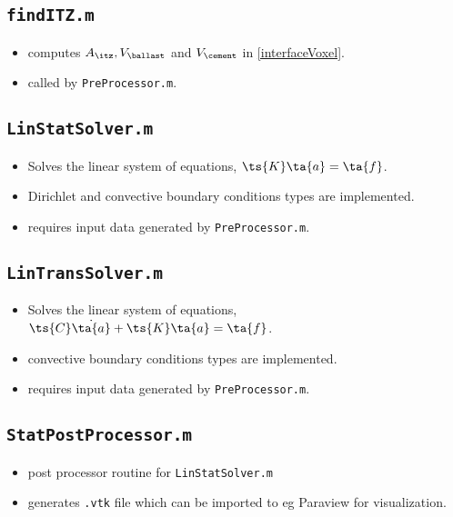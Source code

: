 \documentclass[12pt]{article}
\begin{document}
\subsection{\texttt{findITZ.m} 
}
\begin{itemize}
\item computes $A_\itz, V_\ballast$ and $V_\cement$ in \cref{interfaceVoxel}.
\item called by \verb|PreProcessor.m|.
\end{itemize}

\subsection{\texttt{LinStatSolver.m} 
}
\begin{itemize}
\item Solves the linear system of equations, $\ts{K}\ta{a} = \ta{f}$.
\item Dirichlet and convective boundary conditions types are implemented.
\item requires input data generated by \verb|PreProcessor.m|.
\end{itemize}

\subsection{\texttt{LinTransSolver.m} 
}
\begin{itemize}
\item Solves the linear system of equations, $\ts{C}\dot{\ta{a}} + \ts{K}\ta{a} = \ta{f}$.
\item convective boundary conditions types are implemented.
\item requires input data generated by \verb|PreProcessor.m|.
\end{itemize}

\subsection{\texttt{StatPostProcessor.m} 
}
\begin{itemize}
\item post processor routine for \verb|LinStatSolver.m|
\item generates \verb|.vtk| file which can be imported to eg Paraview for visualization.
\end{itemize}
\end{document}
